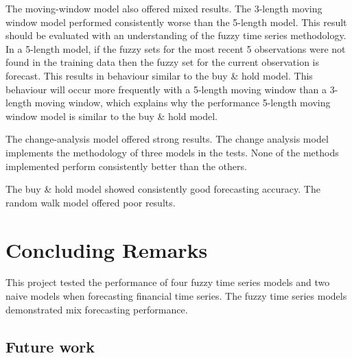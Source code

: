\documentclass[12pt, oneside, a4paper]{article}
\theoremstyle{definition}
\begin{document}
The moving-window model also offered mixed results. The 3-length moving window model performed consistently worse than the 5-length model. This result should be evaluated with an understanding of the fuzzy time series methodology. In a 5-length model, if the fuzzy sets for the most recent 5 observations were not found in the training data then the fuzzy set for the current observation is forecast. This results in behaviour similar to the buy \& hold model. This behaviour will occur more frequently with a 5-length moving window than a 3-length moving window, which explains why the performance 5-length moving window model is similar to the buy \& hold model.

The change-analysis model offered strong results. The change analysis model implements the methodology of three models in the tests. None of the methods implemented perform consistently better than the others. 

The buy \& hold model showed consistently good forecasting accuracy. The random walk model offered poor results.

\section{Concluding Remarks}

This project tested the performance of four fuzzy time series models and two naive models when forecasting financial time series. The fuzzy time series models demonstrated mix forecasting performance. 

\subsection{Future work}
\end{document}
